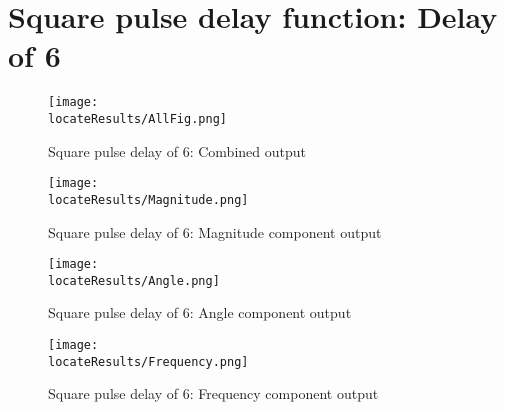 \newpage
\section{Square pulse  delay function: Delay of 6}

\begin{figure}[hb]
    \texttt{[image: \\locateResults/AllFig.png]}    
    \caption{Square pulse  delay of 6: Combined output}
    \label{fig:PMUsim-Sqa6-allfig}
\end{figure}


     \begin{figure}
 
    \texttt{[image: \\locateResults/Magnitude.png]}    
         \label{fig:PMUsim-Sqa6Mag}
        \caption{Square pulse  delay of 6: Magnitude component output}
 
\end{figure}

     \begin{figure}
 
   \texttt{[image: \\locateResults/Angle.png]}    
         \label{fig:PMUsim-Sqa6Ang}
        \caption{Square pulse  delay of 6: Angle component output}
 
\end{figure}

     \begin{figure}
 
   \texttt{[image: \\locateResults/Frequency.png]}    
         \label{fig:PMUsim-Sqa6Freq}
        \caption{Square pulse  delay of 6: Frequency component output}
 
\end{figure}


